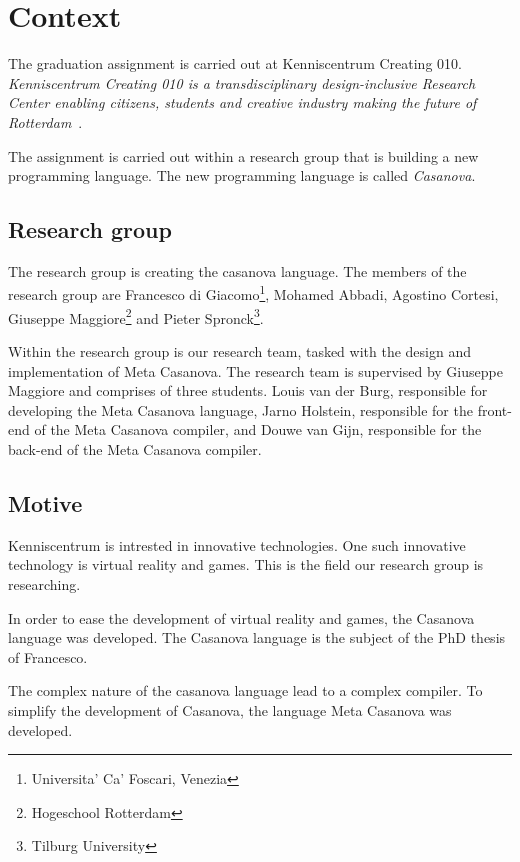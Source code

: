 \section{Context}\label{context}
The graduation assignment is carried out at Kenniscentrum Creating 010.
\textit{Kenniscentrum Creating 010 is a transdisciplinary design-inclusive Research Center enabling citizens, students and creative industry making the future of Rotterdam}~\cite{creating2016home}.

The assignment is carried out within a research group that is building a new programming language.
The new programming language is called \textit{Casanova}.

\subsection{Research group}
The research group is creating the casanova language.
The members of the research group are 
  Francesco di Giacomo\footnote{\label{venice}Universita' Ca' Foscari, Venezia}, 
  Mohamed Abbadi, 
  Agostino Cortesi, 
  Giuseppe Maggiore\footnote{Hogeschool Rotterdam} and 
  Pieter Spronck\footnote{Tilburg University}.

Within the research group is our research team, tasked with the design and implementation of Meta Casanova.
The research team is supervised by Giuseppe Maggiore and comprises of three students.
Louis van der Burg, responsible for developing the Meta Casanova language,
Jarno Holstein, responsible for the front-end of the Meta Casanova compiler,
and Douwe van Gijn, responsible for the back-end of the Meta Casanova compiler.

\subsection{Motive}\label{motive}
Kenniscentrum is intrested in innovative technologies.
One such innovative technology is virtual reality and games.
This is the field our research group is researching.

In order to ease the development of virtual reality and games, the Casanova language was developed.
The Casanova language is the subject of the PhD thesis of Francesco.

The complex nature of the casanova language lead to a complex compiler.
To simplify the development of Casanova, the language Meta Casanova was developed.

